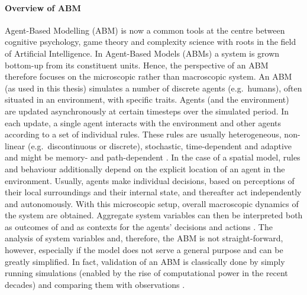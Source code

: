\paragraph{Overview of ABM}
Agent-Based Modelling (ABM) is now a common tools at the centre between cognitive psychology, game theory and complexity science \citep{Bousquet2004} with roots in the field of Artificial Intelligence.
In Agent-Based Models (ABMs) a system is grown bottom-up from its constituent units.
Hence, the perspective of an ABM therefore focuses on the microscopic rather than macroscopic system.
An ABM (as used in this thesis) simulates a number of discrete agents (e.g.\ humans), often situated in an environment, with specific traits.
Agents (and the environment) are updated asynchronously at certain timesteps over the simulated period.
In each update, a single agent interacts with the environment and other agents according to a set of individual rules.
These rules are usually heterogeneous, non-linear (e.g.\ discontinuous or discrete), stochastic, time-dependent and adaptive and might be memory- and path-dependent \citep{Bonabeau2002}.
In the case of a spatial model, rules and behaviour additionally depend on the explicit location of an agent in the environment.
Usually, agents make individual decisions, based on perceptions of their local surroundings and their internal state, and thereafter act independently and autonomously.
With this microscopic setup, overall macroscopic dynamics of the system are obtained.
Aggregate system variables can then be interpreted both as outcomes of and as contexts for the agents' decisions and actions \citep{Kohler2000}.
The analysis of system variables and, therefore, the ABM is not straight-forward, however, especially if the model does not serve a general purpose and can be greatly simplified.
In fact, validation of an ABM is classically done by simply running simulations (enabled by the rise of computational power in the recent decades) and comparing them with observations \citep{Bousquet2004}.






